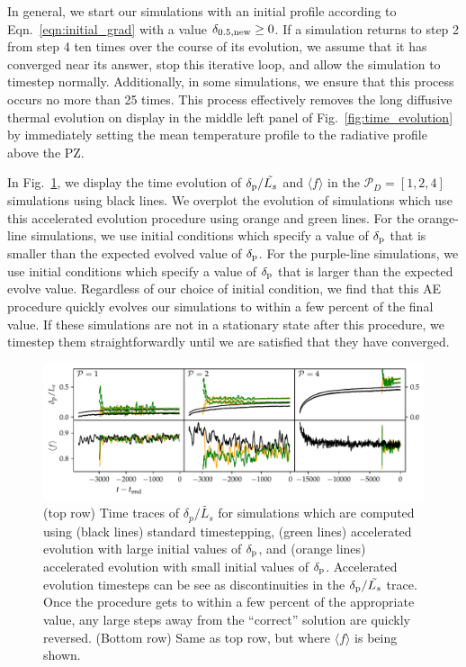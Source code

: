 \documentclass{aastex631}
\newcommand{\delp}{\ensuremath{\delta_{\rm{p}}}}
\newcommand{\mP}{\ensuremath{\mathcal{P}}}
\newcommand{\angles}[1]{\langle #1 \rangle}
\begin{document}
In general, we start our simulations with an initial profile according to Eqn.~\ref{eqn:initial_grad} with a value $\delta_{0.5,\rm{new}} \geq 0$.
If a simulation returns to step 2 from step 4 ten times over the course of its evolution, we assume that it has converged near its answer, stop this iterative loop, and allow the simulation to timestep normally.
Additionally, in some simulations, we ensure that this process occurs no more than 25 times.
This process effectively removes the long diffusive thermal evolution on display in the middle left panel of Fig.~\ref{fig:time_evolution} by immediately setting the mean temperature profile to the radiative profile above the PZ.

In Fig.~\ref{fig:AE_time_figure}, we display the time evolution of $\delp/\tilde{L_s}$ and $\angles{f}$ in the $\mP_D = [1,2,4]$ simulations using black lines.
We overplot the evolution of simulations which use this accelerated evolution procedure using orange and green lines.
For the orange-line simulations, we use initial conditions which specify a value of $\delp$ that is smaller than the expected evolved value of $\delp$.
For the purple-line simulations, we use initial conditions which specify a value of $\delp$ that is larger than the expected evolve value.
Regardless of our choice of initial condition, we find that this AE procedure quickly evolves our simulations to within a few percent of the final value.
If these simulations are not in a stationary state after this procedure, we timestep them straightforwardly until we are satisfied that they have converged.

\begin{figure}[t!]
\centering
\includegraphics[width=\textwidth]{AE_time_figure.pdf}
\caption{
\label{fig:AE_time_figure}
(top row) Time traces of $\delta_p/\tilde{L_s}$ for simulations which are computed using (black lines) standard timestepping, (green lines) accelerated evolution with large initial values of $\delp$, and (orange lines) accelerated evolution with small initial values of $\delp$.
Accelerated evolution timesteps can be see as discontinuities in the $\delp/\tilde{L_s}$ trace.
Once the procedure gets to within a few percent of the appropriate value, any large steps away from the ``correct'' solution are quickly reversed.
(Bottom row) Same as top row, but where $\angles{f}$ is being shown.
}
\end{figure}
\end{document}
